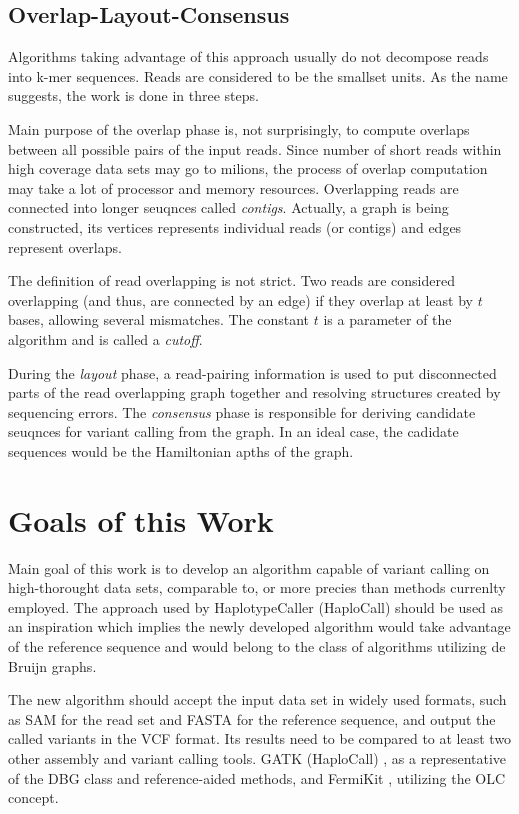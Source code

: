 \subsection{Overlap-Layout-Consensus}
\label{subsec:overlap-layout-consensus}

Algorithms taking advantage of this approach usually do not decompose reads into k-mer sequences. Reads are considered to be the smallset units. As the name suggests, the work is done in three steps.

Main purpose of the overlap phase is, not surprisingly, to compute overlaps between all possible pairs of the input reads. Since number of short reads within high coverage data sets may go to milions, the process of overlap computation may take a lot of processor and memory resources. Overlapping reads are connected into longer seuqnces called \textit{contigs}. Actually, a graph is being constructed, its vertices represents individual reads (or contigs) and edges represent overlaps.

The definition of read overlapping is not strict. Two reads are considered overlapping (and thus, are connected by an edge) if they overlap at least by $t$ bases, allowing several mismatches. The constant $t$ is a parameter of the algorithm and is called a \textit{cutoff}.

During the \textit{layout} phase, a read-pairing information is used to put disconnected parts of the read overlapping graph together and resolving structures created by sequencing errors. The \textit{consensus} phase is responsible for deriving candidate seuqnces for variant calling from the graph. In an ideal case, the cadidate sequences would be the Hamiltonian apths of the graph.

\section{Goals of this Work}
\label{sec:goals-of-this-work}

Main goal of this work is to develop an algorithm capable of variant calling on high-thorought data sets, comparable to, or more precies than methods currenlty employed. The approach used by HaplotypeCaller (HaploCall) should be used as an inspiration which implies the newly developed algorithm would take advantage of the reference sequence and would belong to the class of algorithms utilizing de Bruijn graphs.

The new algorithm should accept the input data set in widely used formats, such as SAM for the read set and FASTA for the reference sequence, and output the called variants in the VCF format. Its results need to be compared to at least two other assembly and variant calling tools. GATK (HaploCall) \cite{haplocall}, as a representative of the DBG class and reference-aided methods, and FermiKit \cite{fermikit}, utilizing the OLC concept.